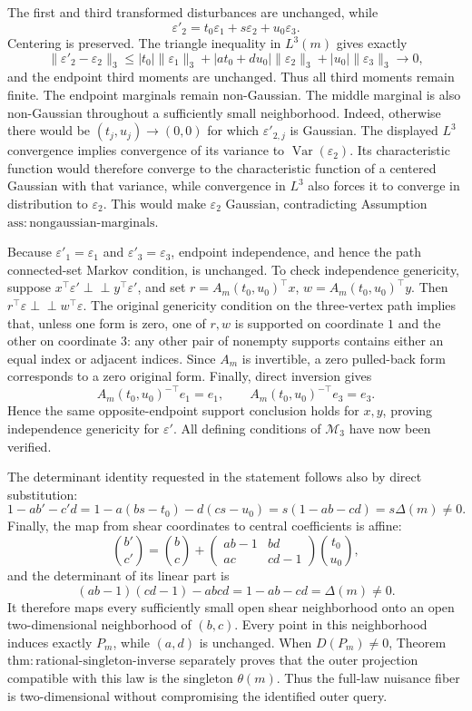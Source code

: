 The first and third transformed disturbances are unchanged, while
\[
\varepsilon'_2=t_0\varepsilon_1+s\varepsilon_2+u_0\varepsilon_3.
\]
Centering is preserved. The triangle inequality in \(L^3(m)\) gives exactly
\[
\|\varepsilon'_2-\varepsilon_2\|_3
\le |t_0|\|\varepsilon_1\|_3
+|at_0+du_0|\|\varepsilon_2\|_3
+|u_0|\|\varepsilon_3\|_3\longrightarrow0,
\]
and the endpoint third moments are unchanged. Thus all third moments remain finite. The endpoint marginals remain non-Gaussian. The middle marginal is also non-Gaussian throughout a sufficiently small neighborhood. Indeed, otherwise there would be \((t_j,u_j)\to(0,0)\) for which \(\varepsilon'_{2,j}\) is Gaussian. The displayed \(L^3\) convergence implies convergence of its variance to \(\operatorname{Var}(\varepsilon_2)\). Its characteristic function would therefore converge to the characteristic function of a centered Gaussian with that variance, while convergence in \(L^3\) also forces it to converge in distribution to \(\varepsilon_2\). This would make \(\varepsilon_2\) Gaussian, contradicting Assumption \(\mathrm{ass:nongaussian\mbox{-}marginals}\).

Because \(\varepsilon'_1=\varepsilon_1\) and \(\varepsilon'_3=\varepsilon_3\), endpoint independence, and hence the path connected-set Markov condition, is unchanged. To check independence genericity, suppose \(x^\top\varepsilon'\perp\!\!\!\perp y^\top\varepsilon'\), and set \(r=A_m(t_0,u_0)^\top x\), \(w=A_m(t_0,u_0)^\top y\). Then \(r^\top\varepsilon\perp\!\!\!\perp w^\top\varepsilon\). The original genericity condition on the three-vertex path implies that, unless one form is zero, one of \(r,w\) is supported on coordinate \(1\) and the other on coordinate \(3\): any other pair of nonempty supports contains either an equal index or adjacent indices. Since \(A_m\) is invertible, a zero pulled-back form corresponds to a zero original form. Finally, direct inversion gives
\[
A_m(t_0,u_0)^{-\top}e_1=e_1,
\qquad
A_m(t_0,u_0)^{-\top}e_3=e_3.
\]
Hence the same opposite-endpoint support conclusion holds for \(x,y\), proving independence genericity for \(\varepsilon'\). All defining conditions of \(\mathcal M_3\) have now been verified.

The determinant identity requested in the statement follows also by direct substitution:
\[
1-ab'-c'd
=1-a(bs-t_0)-d(cs-u_0)
=s(1-ab-cd)=s\Delta(m)\neq0.
\]
Finally, the map from shear coordinates to central coefficients is affine:
\[
\binom{b'}{c'}=
\binom bc+
\begin{pmatrix}ab-1&bd\\ac&cd-1\end{pmatrix}
\binom{t_0}{u_0},
\]
and the determinant of its linear part is
\[
(ab-1)(cd-1)-abcd=1-ab-cd=\Delta(m)\neq0.
\]
It therefore maps every sufficiently small open shear neighborhood onto an open two-dimensional neighborhood of \((b,c)\). Every point in this neighborhood induces exactly \(P_m\), while \((a,d)\) is unchanged. When \(D(P_m)\neq0\), Theorem \(\mathrm{thm:rational\mbox{-}singleton\mbox{-}inverse}\) separately proves that the outer projection compatible with this law is the singleton \(\theta(m)\). Thus the full-law nuisance fiber is two-dimensional without compromising the identified outer query.

